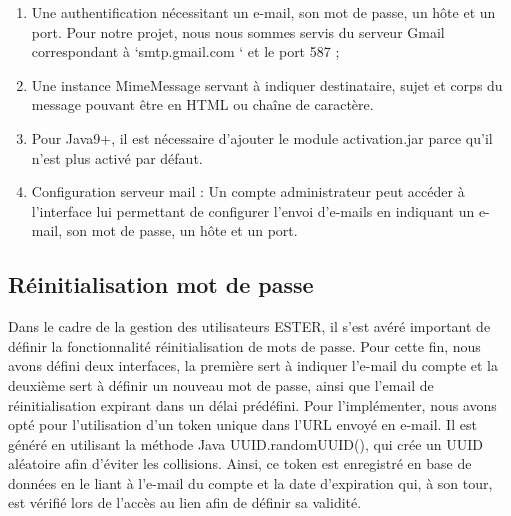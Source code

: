 \begin{itemize}
\begin{enumerate}
\item Une authentification nécessitant un e-mail, son mot de passe, un hôte et un port.  Pour notre projet, nous nous sommes servis du serveur Gmail correspondant à ‘smtp.gmail.com ‘ et le port 587 ;
\item Une instance MimeMessage servant à indiquer destinataire, sujet et corps du message pouvant être en HTML ou chaîne de caractère.
\item Pour Java9+, il est nécessaire d’ajouter le module activation.jar parce qu’il n’est plus activé par défaut.
\item Configuration serveur mail :
Un compte administrateur peut accéder à l’interface lui permettant de configurer l’envoi d’e-mails en indiquant un e-mail, son mot de passe, un hôte et un port.  
\end{enumerate}


\end{itemize}
    

\subsection{Réinitialisation mot de passe}
	Dans le cadre de la gestion des utilisateurs ESTER, il s’est avéré important de définir la fonctionnalité réinitialisation de mots de passe. Pour cette fin, nous avons défini deux interfaces, la première sert à indiquer l’e-mail du compte et la deuxième sert à définir un nouveau mot de passe, ainsi que l’email de réinitialisation expirant dans un délai prédéfini. Pour l’implémenter, nous avons opté pour l’utilisation d’un token unique dans l’URL envoyé en e-mail. Il est généré en utilisant la méthode Java UUID.randomUUID(), qui crée un UUID aléatoire afin d’éviter les collisions. Ainsi, ce token est enregistré en base de données en le liant à l’e-mail du compte et la date d’expiration qui, à son tour, est vérifié lors de l’accès au lien afin de définir sa validité.